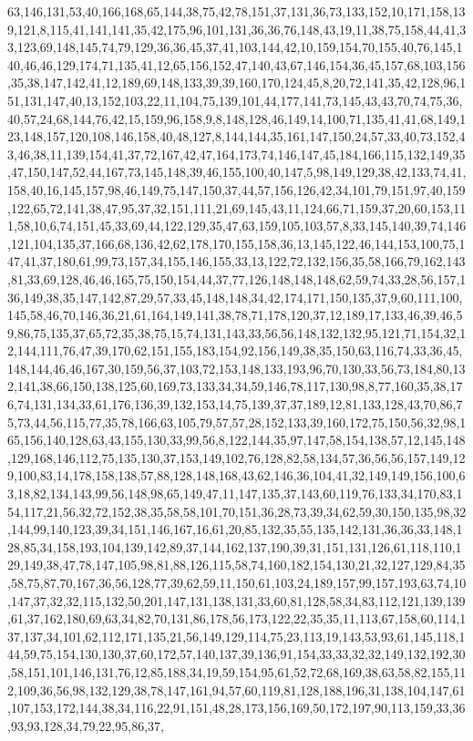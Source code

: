 \documentclass[11pt]{article}
\begin{document}
\begin{vncode}
63,146,131,53,40,166,168,65,144,38,75,42,78,151,37,131,36,73,133,152,10,171,158,139,121,8,115,41,141,141,35,42,175,96,101,131,36,36,76,148,43,19,11,38,75,158,44,41,33,123,69,148,145,74,79,129,36,36,45,37,41,103,144,42,10,159,154,70,155,40,76,145,140,46,46,129,174,71,135,41,12,65,156,152,47,140,43,67,146,154,36,45,157,68,103,156,35,38,147,142,41,12,189,69,148,133,39,39,160,170,124,45,8,20,72,141,35,42,128,96,151,131,147,40,13,152,103,22,11,104,75,139,101,44,177,141,73,145,43,43,70,74,75,36,40,57,24,68,144,76,42,15,159,96,158,9,8,148,128,46,149,14,100,71,135,41,41,68,149,123,148,157,120,108,146,158,40,48,127,8,144,144,35,161,147,150,24,57,33,40,73,152,43,46,38,11,139,154,41,37,72,167,42,47,164,173,74,146,147,45,184,166,115,132,149,35,47,150,147,52,44,167,73,145,148,39,46,155,100,40,147,5,98,149,129,38,42,133,74,41,158,40,16,145,157,98,46,149,75,147,150,37,44,57,156,126,42,34,101,79,151,97,40,159,122,65,72,141,38,47,95,37,32,151,111,21,69,145,43,11,124,66,71,159,37,20,60,153,111,58,10,6,74,151,45,33,69,44,122,129,35,47,63,159,105,103,57,8,33,145,140,39,74,146,121,104,135,37,166,68,136,42,62,178,170,155,158,36,13,145,122,46,144,153,100,75,147,41,37,180,61,99,73,157,34,155,146,155,33,13,122,72,132,156,35,58,166,79,162,143,81,33,69,128,46,46,165,75,150,154,44,37,77,126,148,148,148,62,59,74,33,28,56,157,136,149,38,35,147,142,87,29,57,33,45,148,148,34,42,174,171,150,135,37,9,60,111,100,145,58,46,70,146,36,21,61,164,149,141,38,78,71,178,120,37,12,189,17,133,46,39,46,59,86,75,135,37,65,72,35,38,75,15,74,131,143,33,56,56,148,132,132,95,121,71,154,32,12,144,111,76,47,39,170,62,151,155,183,154,92,156,149,38,35,150,63,116,74,33,36,45,148,144,46,46,167,30,159,56,37,103,72,153,148,133,193,96,70,130,33,56,73,184,80,132,141,38,66,150,138,125,60,169,73,133,34,34,59,146,78,117,130,98,8,77,160,35,38,176,74,131,134,33,61,176,136,39,132,153,14,75,139,37,37,189,12,81,133,128,43,70,86,75,73,44,56,115,77,35,78,166,63,105,79,57,57,28,152,133,39,160,172,75,150,56,32,98,165,156,140,128,63,43,155,130,33,99,56,8,122,144,35,97,147,58,154,138,57,12,145,148,129,168,146,112,75,135,130,37,153,149,102,76,128,82,58,134,57,36,56,56,157,149,129,100,83,14,178,158,138,57,88,128,148,168,43,62,146,36,104,41,32,149,149,156,100,63,18,82,134,143,99,56,148,98,65,149,47,11,147,135,37,143,60,119,76,133,34,170,83,154,117,21,56,32,72,152,38,35,58,58,101,70,151,36,28,73,39,34,62,59,30,150,135,98,32,144,99,140,123,39,34,151,146,167,16,61,20,85,132,35,55,135,142,131,36,36,33,148,128,85,34,158,193,104,139,142,89,37,144,162,137,190,39,31,151,131,126,61,118,110,129,149,38,47,78,147,105,98,81,88,126,115,58,74,160,182,154,130,21,32,127,129,84,35,58,75,87,70,167,36,56,128,77,39,62,59,11,150,61,103,24,189,157,99,157,193,63,74,10,147,37,32,32,115,132,50,201,147,131,138,131,33,60,81,128,58,34,83,112,121,139,139,61,37,162,180,69,63,34,82,70,131,86,178,56,173,122,22,35,35,11,113,67,158,60,114,137,137,34,101,62,112,171,135,21,56,149,129,114,75,23,113,19,143,53,93,61,145,118,144,59,75,154,130,130,37,60,172,57,140,137,39,136,91,154,33,33,32,32,149,132,192,30,58,151,101,146,131,76,12,85,188,34,19,59,154,95,61,52,72,68,169,38,63,58,82,155,112,109,36,56,98,132,129,38,78,147,161,94,57,60,119,81,128,188,196,31,138,104,147,61,107,153,172,144,38,34,116,22,91,151,48,28,173,156,169,50,172,197,90,113,159,33,36,93,93,128,34,79,22,95,86,37,
\end{vncode}
\end{document}
